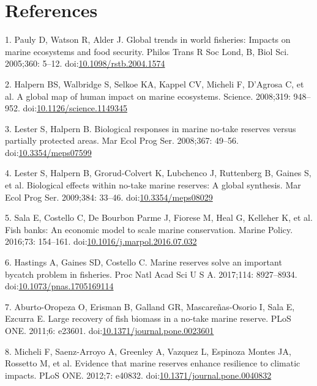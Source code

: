 \documentclass[12pt,]{article}
\begin{document}
\clearpage

\section{References}\label{references}

\hypertarget{refs}{}
\hypertarget{ref-pauly_2005-qV}{}
1. Pauly D, Watson R, Alder J. Global trends in world fisheries: Impacts
on marine ecosystems and food security. Philos Trans R Soc Lond, B, Biol
Sci. 2005;360: 5--12.
doi:\href{https://doi.org/10.1098/rstb.2004.1574}{10.1098/rstb.2004.1574}

\hypertarget{ref-halpern_2008-dK}{}
2. Halpern BS, Walbridge S, Selkoe KA, Kappel CV, Micheli F, D'Agrosa C,
et al. A global map of human impact on marine ecosystems. Science.
2008;319: 948--952.
doi:\href{https://doi.org/10.1126/science.1149345}{10.1126/science.1149345}

\hypertarget{ref-lester_2008-F_}{}
3. Lester S, Halpern B. Biological responses in marine no-take reserves
versus partially protected areas. Mar Ecol Prog Ser. 2008;367: 49--56.
doi:\href{https://doi.org/10.3354/meps07599}{10.3354/meps07599}

\hypertarget{ref-lester_2009-Ks}{}
4. Lester S, Halpern B, Grorud-Colvert K, Lubchenco J, Ruttenberg B,
Gaines S, et al. Biological effects within no-take marine reserves: A
global synthesis. Mar Ecol Prog Ser. 2009;384: 33--46.
doi:\href{https://doi.org/10.3354/meps08029}{10.3354/meps08029}

\hypertarget{ref-sala_2016-PV}{}
5. Sala E, Costello C, De Bourbon Parme J, Fiorese M, Heal G, Kelleher
K, et al. Fish banks: An economic model to scale marine conservation.
Marine Policy. 2016;73: 154--161.
doi:\href{https://doi.org/10.1016/j.marpol.2016.07.032}{10.1016/j.marpol.2016.07.032}

\hypertarget{ref-hastings_2017-sm}{}
6. Hastings A, Gaines SD, Costello C. Marine reserves solve an important
bycatch problem in fisheries. Proc Natl Acad Sci U S A. 2017;114:
8927--8934.
doi:\href{https://doi.org/10.1073/pnas.1705169114}{10.1073/pnas.1705169114}

\hypertarget{ref-aburtooropeza_2011-ya}{}
7. Aburto-Oropeza O, Erisman B, Galland GR, Mascareñas-Osorio I, Sala E,
Ezcurra E. Large recovery of fish biomass in a no-take marine reserve.
PLoS ONE. 2011;6: e23601.
doi:\href{https://doi.org/10.1371/journal.pone.0023601}{10.1371/journal.pone.0023601}

\hypertarget{ref-micheli_2012-EU}{}
8. Micheli F, Saenz-Arroyo A, Greenley A, Vazquez L, Espinoza Montes JA,
Rossetto M, et al. Evidence that marine reserves enhance resilience to
climatic impacts. PLoS ONE. 2012;7: e40832.
doi:\href{https://doi.org/10.1371/journal.pone.0040832}{10.1371/journal.pone.0040832}
\end{document}
